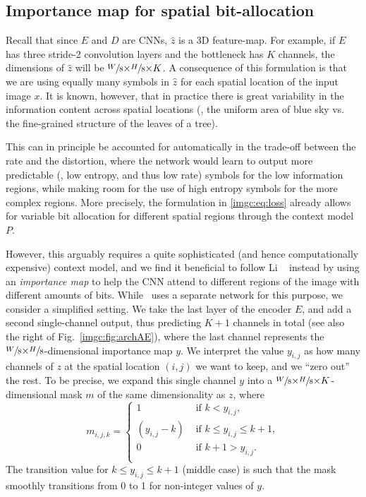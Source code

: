 \subsection{Importance map for spatial bit-allocation}
\label{imgc:sec:importancemap}
Recall that since $E$ and $D$ are CNNs, $\hat z$ is a 3D feature-map.
For example, if $E$ has three stride-2 convolution layers and the bottleneck
has $K$ channels, the dimensions of $\hat z$ will be
$\sfrac{W}{8}{\times}\sfrac{H}{8}{\times}K$. A consequence of this formulation is
that we are using equally many symbols in $\hat z$ for each spatial location of
the input image $x$. It is known, however, that in practice there is great
variability in the information content across spatial locations (\eg, the
uniform area of blue sky vs. the fine-grained structure of the leaves of a
tree).

This can in principle be accounted for automatically in the trade-off between
the rate and the distortion, where the network would learn to output more
predictable (\ie, low entropy, and thus low rate) symbols for the low information regions, while
making room for the use of high entropy symbols for the more complex regions.
More precisely, the formulation in \eqref{imgc:eq:loss} already allows for
variable bit allocation for different spatial regions through the context model
$P$.

However, this arguably requires a quite sophisticated (and hence
computationally expensive) context model, and we find it beneficial to follow
Li \etal~\cite{li2017learning} instead by using an \textit{importance map} to
help the CNN attend to different regions of the image with different amounts of
bits.
While~\cite{li2017learning} uses a separate network for this purpose, we
consider a simplified setting. We take the last layer of the encoder $E$, and
add a second single-channel output, thus predicting $K+1$ channels in total (see also the right of Fig.~\ref{imgc:fig:archAE}), where the
last channel represents the $\sfrac{W}{8}{\times}\sfrac{H}{8}$-dimensional importance map $y$.
We interpret the value $y_{i,j}$ as how many channels of $z$ at the spatial location $(i, j)$ we want to keep, and we ``zero out'' the rest. To be precise, we expand this single channel $y$ into a $\sfrac{W}{8}{\times}\sfrac{H}{8}{\times}K$-dimensional mask $m$ of the same dimensionality as $z$, where
\begin{equation}
m_{i,j,k} = \begin{cases}
1  & \text{ if } k < y_{i,j}, \\
(y_{i,j}-k)  & \text{ if }  k \leq y_{i,j} \leq k+1, \\
0  & \text{ if } k+1 > y_{i,j}. \\
\end{cases}\label{imgc:eq:expand_map}
\end{equation}
The transition value for $k \leq y_{i,j} \leq k+1$ (middle case) is such that the mask smoothly transitions from 0 to 1 for non-integer values of $y$.

